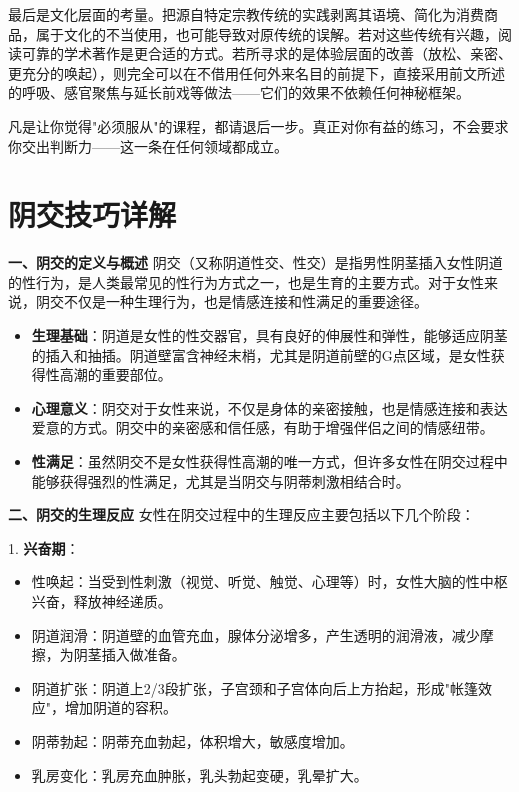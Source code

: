\documentclass[12pt,UTF8]{ctexbook}
\begin{document}
最后是文化层面的考量。把源自特定宗教传统的实践剥离其语境、简化为消费商品，属于文化的不当使用，也可能导致对原传统的误解。若对这些传统有兴趣，阅读可靠的学术著作是更合适的方式。若所寻求的是体验层面的改善（放松、亲密、更充分的唤起），则完全可以在不借用任何外来名目的前提下，直接采用前文所述的呼吸、感官聚焦与延长前戏等做法——它们的效果不依赖任何神秘框架。

\begin{tcolorbox}[colback=pink!5!white,colframe=red!50!black,title=贴心小叮咛]
	凡是让你觉得"必须服从"的课程，都请退后一步。真正对你有益的练习，不会要求你交出判断力——这一条在任何领域都成立。
\end{tcolorbox}

\chapter{阴交技巧详解}

\textbf{一、阴交的定义与概述}
阴交（又称阴道性交、性交）是指男性阴茎插入女性阴道的性行为，是人类最常见的性行为方式之一，也是生育的主要方式。对于女性来说，阴交不仅是一种生理行为，也是情感连接和性满足的重要途径。

\begin{itemize}
	\item \textbf{生理基础}：阴道是女性的性交器官，具有良好的伸展性和弹性，能够适应阴茎的插入和抽插。阴道壁富含神经末梢，尤其是阴道前壁的G点区域，是女性获得性高潮的重要部位。
	\item \textbf{心理意义}：阴交对于女性来说，不仅是身体的亲密接触，也是情感连接和表达爱意的方式。阴交中的亲密感和信任感，有助于增强伴侣之间的情感纽带。
	\item \textbf{性满足}：虽然阴交不是女性获得性高潮的唯一方式，但许多女性在阴交过程中能够获得强烈的性满足，尤其是当阴交与阴蒂刺激相结合时。
\end{itemize}

\textbf{二、阴交的生理反应}
女性在阴交过程中的生理反应主要包括以下几个阶段：

1. \textbf{兴奋期}：
\begin{itemize}
	\item 性唤起：当受到性刺激（视觉、听觉、触觉、心理等）时，女性大脑的性中枢兴奋，释放神经递质。
	\item 阴道润滑：阴道壁的血管充血，腺体分泌增多，产生透明的润滑液，减少摩擦，为阴茎插入做准备。
	\item 阴道扩张：阴道上2/3段扩张，子宫颈和子宫体向后上方抬起，形成"帐篷效应"，增加阴道的容积。
	\item 阴蒂勃起：阴蒂充血勃起，体积增大，敏感度增加。
	\item 乳房变化：乳房充血肿胀，乳头勃起变硬，乳晕扩大。
\end{itemize}
\end{document}
